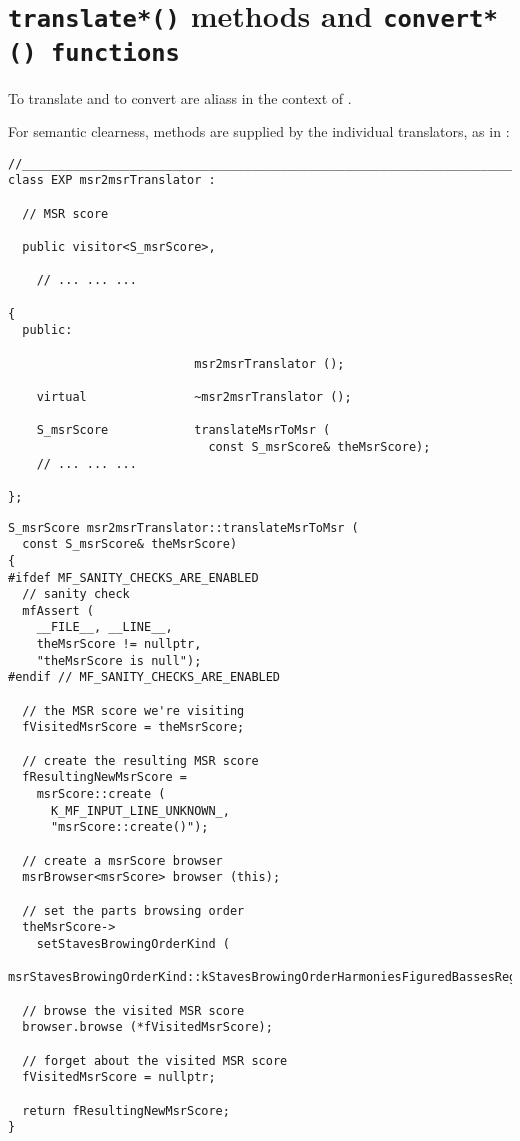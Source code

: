 \section{{\tt translate*()} methods and {\tt convert*() functions}}

To translate and to convert are aliass in the context of \mf.

For semantic clearness,  methods are supplied by the individual translators, as in :
\begin{lstlisting}[language=CPlusPlus]
//________________________________________________________________________
class EXP msr2msrTranslator :

  // MSR score

  public visitor<S_msrScore>,

	// ... ... ...

{
  public:

                          msr2msrTranslator ();

    virtual               ~msr2msrTranslator ();

    S_msrScore            translateMsrToMsr (
                            const S_msrScore& theMsrScore);
	// ... ... ...

};
\end{lstlisting}

\begin{lstlisting}[language=CPlusPlus]
S_msrScore msr2msrTranslator::translateMsrToMsr (
  const S_msrScore& theMsrScore)
{
#ifdef MF_SANITY_CHECKS_ARE_ENABLED
  // sanity check
  mfAssert (
    __FILE__, __LINE__,
    theMsrScore != nullptr,
    "theMsrScore is null");
#endif // MF_SANITY_CHECKS_ARE_ENABLED

  // the MSR score we're visiting
  fVisitedMsrScore = theMsrScore;

  // create the resulting MSR score
  fResultingNewMsrScore =
    msrScore::create (
      K_MF_INPUT_LINE_UNKNOWN_,
      "msrScore::create()");

  // create a msrScore browser
  msrBrowser<msrScore> browser (this);

  // set the parts browsing order
  theMsrScore->
    setStavesBrowingOrderKind (
      msrStavesBrowingOrderKind::kStavesBrowingOrderHarmoniesFiguredBassesRegulars);

  // browse the visited MSR score
  browser.browse (*fVisitedMsrScore);

  // forget about the visited MSR score
  fVisitedMsrScore = nullptr;

  return fResultingNewMsrScore;
}
\end{lstlisting}

